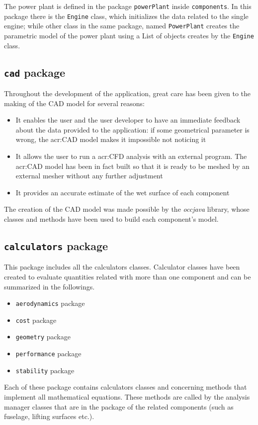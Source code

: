 \bigskip
\noindent
The power plant is defined in the package \lstinline[language=Java]!powerPlant! inside \lstinline[language=Java]!components!. In this package there is the \lstinline[language=Java]!Engine! class, which initializes the data related to the single engine; while other class in the same package, named \lstinline[language=Java]!PowerPlant! creates the parametric model of the power plant using a \gls{List}\cite{listAPI} of objects creates by the \lstinline[language=Java]!Engine! class.
%
\subsection{\texttt{cad} package}
Throughout the development of the application, great care has been given to the making of the CAD model for several reasons:
%
\begin{itemize}
	\item It enables the user and the user developer to have an immediate feedback about the data provided to the application: if some geometrical parameter is wrong, the \gls{acr:CAD} model makes it impossible not noticing it
	\item It allows the user to run a \gls{acr:CFD} analysis with an external program. The \gls{acr:CAD} model has been in fact built so that it is ready to be meshed by an external mesher without any further adjustment
	\item It provides an accurate estimate of the wet surface of each component
\end{itemize}
%
The creation of the CAD model was made possible by the \emph{occjava} library, whose classes and methods have been used to build each component's model.
%
\subsection{\texttt{calculators} package}
This package includes all the calculators classes. Calculator classes have been created to evaluate quantities related with more than one component and can be summarized in the followings.
%
 \begin{itemize}
\item \lstinline[language=Java]!aerodynamics! package
\item \lstinline[language=Java]!cost! package
\item \lstinline[language=Java]!geometry! package
\item \lstinline[language=Java]!performance! package
\item \lstinline[language=Java]!stability! package
\end{itemize} 
%
Each of these package contains calculators classes and concerning methods that implement all mathematical equations. These methods are called by the analysis manager classes that are in the package of the related components (such as fuselage, lifting surfaces etc.).
%
